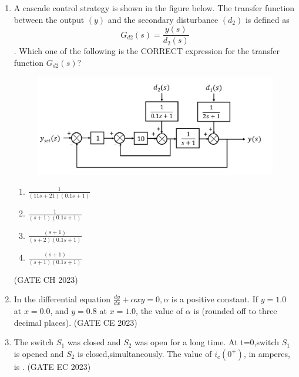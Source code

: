 \begin{enumerate}[label=\thechapter.\arabic*,ref=\thechapter.\theenumi]
\newpage
\item  A cascade control strategy is shown in the figure below. The transfer function between the output $(y)$ and the secondary disturbance $(d_2)$ is defined as  \\
$$G_{d2}(s)= \frac{y(s)}{d_2(s)}$$. 
Which one of the following is the CORRECT expression for the transfer function $G_{d2}(s)$? \\
\begin{figure}[h]
    \centering
    \includegraphics[scale=0.25]{2023/CH/44/figs/g44fig1.jpeg}
    \caption{ }
    \label{}
\end{figure}
\begin{enumerate}[label=\Alph*.]
\item $\frac{1}{(11s+21)(0.1s+1)}$ 
\item $\frac{1}{(s+1)(0.1s+1)}$
\item $\frac{(s+1)}{(s+2)(0.1s+1)}$
\item $\frac{(s+1)}{(s+1)(0.1s+1)}$
\end{enumerate} \hfill (GATE CH 2023)
\solution
\newpage
\item In the differential equation $\frac{dy}{dx} + \alpha x y = 0, \alpha$ is a positive constant. If $y = 1.0$ at
$x = 0.0$, and $y = 0.8$ at $x = 1.0$, the value of $\alpha$ is (rounded off to three decimal places).  \hfill(GATE CE 2023)
\solution

\newpage
\item The switch $S_1$ was closed and $S_2$ was open for a long time. At t=0,switch $S_1$ is opened and $S_2$ is closed,simultaneously. The value of $i_c(0^{+})$, in amperes, is . \hfill (GATE EC 2023)\\

\newpage


\end{enumerate}
